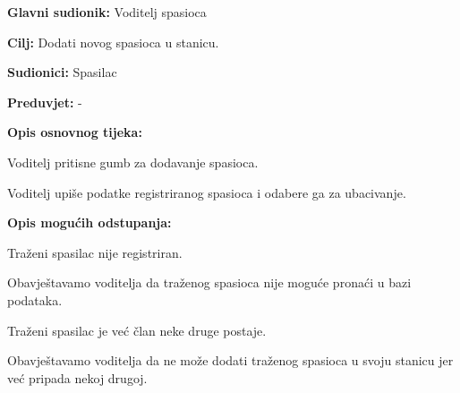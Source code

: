 \begin{packed_item}
\begin{packed_item}
				\end{packed_item}
			\newpage
			\end{packed_item}
				
				\noindent {}
				\begin{packed_item}
					
					\item \textbf{Glavni sudionik: } Voditelj spasioca
					\item  \textbf{Cilj:} Dodati novog spasioca u stanicu.
					\item  \textbf{Sudionici:} Spasilac
					\item  \textbf{Preduvjet:} -
					\item  \textbf{Opis osnovnog tijeka:}
					
					\item[] \begin{packed_enum}
						
						\item Voditelj pritisne gumb za dodavanje spasioca.
						\item Voditelj upiše podatke registriranog spasioca i odabere ga za ubacivanje.
						
					\end{packed_enum}
					
					\item  \textbf{Opis mogućih odstupanja:}
					
					\item[] \begin{packed_item}
						
						\item[2.a] Traženi spasilac nije registriran.
						\item[] \begin{packed_enum}
							
							\item Obavještavamo voditelja da traženog spasioca nije moguće pronaći u bazi podataka.
						\end{packed_enum}
						
						\item[2.b] Traženi spasilac je već član neke druge postaje.
						\item[] \begin{packed_enum}
							
							\item Obavještavamo voditelja da ne može dodati traženog spasioca u svoju stanicu jer već pripada nekoj drugoj.\\		
						\end{packed_enum}
					\end{packed_item}
					
				\end{packed_item}
				
